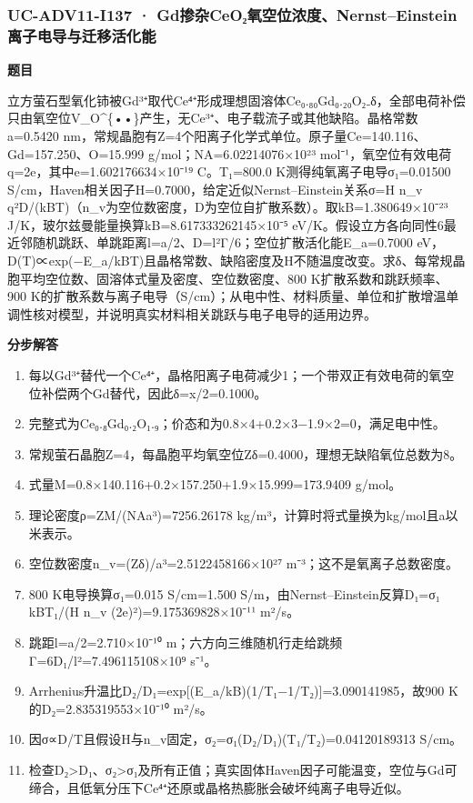 \documentclass[UTF8,11pt,a4paper]{ctexart}
\begin{document}
\subsubsection*{UC-ADV11-I137 · Gd掺杂CeO₂氧空位浓度、Nernst–Einstein离子电导与迁移活化能}
\noindent\textbf{题目}\par
立方萤石型氧化铈被Gd³⁺取代Ce⁴⁺形成理想固溶体Ce₀.₈₀Gd₀.₂₀O₂₋δ，全部电荷补偿只由氧空位V\_O\textasciicircum{}\{••\}产生，无Ce³⁺、电子载流子或其他缺陷。晶格常数a=0.5420 nm，常规晶胞有Z=4个阳离子化学式单位。原子量Ce=140.116、Gd=157.250、O=15.999 g/mol；NA=6.02214076×10²³ mol⁻¹，氧空位有效电荷q=2e，其中e=1.602176634×10⁻¹⁹ C。T₁=800.0 K测得纯氧离子电导σ₁=0.01500 S/cm，Haven相关因子H=0.7000，给定近似Nernst–Einstein关系σ=H n\_v q²D/(kBT)（n\_v为空位数密度，D为空位自扩散系数）。取kB=1.380649×10⁻²³ J/K，玻尔兹曼能量换算kB=8.617333262145×10⁻⁵ eV/K。假设立方各向同性6最近邻随机跳跃、单跳距离l=a/2、D=l²Γ/6；空位扩散活化能E\_a=0.7000 eV，D(T)∝exp(−E\_a/kBT)且晶格常数、缺陷密度及H不随温度改变。求δ、每常规晶胞平均空位数、固溶体式量及密度、空位数密度、800 K扩散系数和跳跃频率、900 K的扩散系数与离子电导（S/cm）；从电中性、材料质量、单位和扩散增温单调性核对模型，并说明真实材料相关跳跃与电子电导的适用边界。\par
\medskip\noindent\textbf{分步解答}
\begin{enumerate}
\item 每以Gd³⁺替代一个Ce⁴⁺，晶格阳离子电荷减少1；一个带双正有效电荷的氧空位补偿两个Gd替代，因此δ=x/2=0.1000。
\item 完整式为Ce₀.₈Gd₀.₂O₁.₉；价态和为0.8×4+0.2×3−1.9×2=0，满足电中性。
\item 常规萤石晶胞Z=4，每晶胞平均氧空位Zδ=0.4000，理想无缺陷氧位总数为8。
\item 式量M=0.8×140.116+0.2×157.250+1.9×15.999=173.9409 g/mol。
\item 理论密度ρ=ZM/(NAa³)=7256.26178 kg/m³，计算时将式量换为kg/mol且a以米表示。
\item 空位数密度n\_v=(Zδ)/a³=2.5122458166×10²⁷ m⁻³；这不是氧离子总数密度。
\item 800 K电导换算σ₁=0.015 S/cm=1.500 S/m，由Nernst–Einstein反算D₁=σ₁ kBT₁/(H n\_v (2e)²)=9.175369828×10⁻¹¹ m²/s。
\item 跳距l=a/2=2.710×10⁻¹⁰ m；六方向三维随机行走给跳频Γ=6D₁/l²=7.496115108×10⁹ s⁻¹。
\item Arrhenius升温比D₂/D₁=exp[(E\_a/kB)(1/T₁−1/T₂)]=3.090141985，故900 K的D₂=2.835319553×10⁻¹⁰ m²/s。
\item 因σ∝D/T且假设H与n\_v固定，σ₂=σ₁(D₂/D₁)(T₁/T₂)=0.04120189313 S/cm。
\item 检查D₂>D₁、σ₂>σ₁及所有正值；真实固体Haven因子可能温变，空位与Gd可缔合，且低氧分压下Ce⁴⁺还原或晶格热膨胀会破坏纯离子电导近似。
\end{enumerate}
\end{document}
